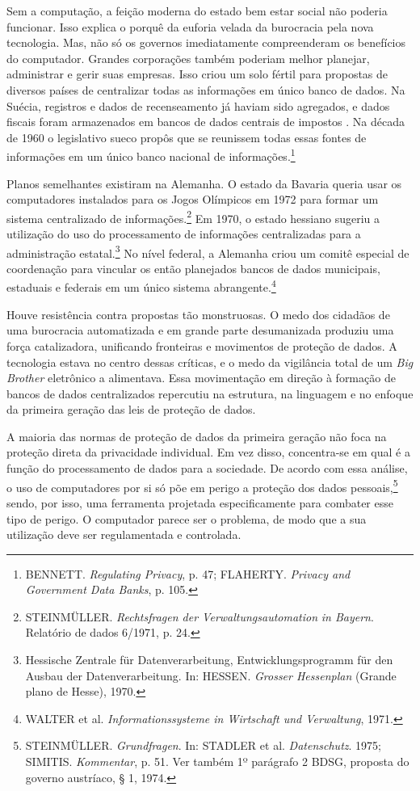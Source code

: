 Sem a computação, a feição moderna do estado bem estar social não
poderia funcionar. Isso explica o porquê da euforia velada da burocracia
pela nova tecnologia. Mas, não só os governos imediatamente
compreenderam os benefícios do computador. Grandes corporações também
poderiam melhor planejar, administrar e gerir suas empresas. Isso criou
um solo fértil para propostas de diversos países de centralizar todas as
informações em único banco de dados. Na Suécia, registros e dados de
recenseamento já haviam sido agregados, e dados fiscais foram
armazenados em bancos de dados centrais de impostos . Na década de 1960
o legislativo sueco propôs que se reunissem todas essas fontes de
informações em um único banco nacional de informações.\footnote{BENNETT.
  \emph{Regulating Privacy}, p. 47; FLAHERTY. \emph{Privacy and
  Government Data Banks}, p. 105.}

Planos semelhantes existiram na Alemanha. O estado da Bavaria queria
usar os computadores instalados para os Jogos Olímpicos em 1972 para
formar um sistema centralizado de informações.\footnote{STEINMÜLLER.
  \emph{Rechtsfragen der Verwaltungsautomation} \emph{in Bayern}.
  Relatório de dados 6/1971, p. 24.} Em 1970, o estado hessiano sugeriu
a utilização do uso do processamento de informações centralizadas para a
administração estatal.\footnote{Hessische Zentrale für
  Datenverarbeitung, Entwicklungsprogramm für den Ausbau der
  Datenverarbeitung. In: HESSEN. \emph{Grosser Hessenplan} (Grande plano
  de Hesse), 1970.} No nível federal, a Alemanha criou um comitê
especial de coordenação para vincular os então planejados bancos de
dados municipais, estaduais e federais em um único sistema
abrangente.\footnote{WALTER et al. \emph{Informationssysteme in
  Wirtschaft und Verwaltung}, 1971.}

Houve resistência contra propostas tão monstruosas. O medo dos cidadãos
de uma burocracia automatizada e em grande parte desumanizada produziu
uma força catalizadora, unificando fronteiras e movimentos de proteção
de dados. A tecnologia estava no centro dessas críticas, e o medo da
vigilância total de um \emph{Big Brother} eletrônico a alimentava. Essa
movimentação em direção à formação de bancos de dados centralizados
repercutiu na estrutura, na linguagem e no enfoque da primeira geração
das leis de proteção de dados.

A maioria das normas de proteção de dados da primeira geração não foca
na proteção direta da privacidade individual. Em vez disso, concentra-se
em qual é a função do processamento de dados para a sociedade. De acordo
com essa análise, o uso de computadores por si só põe em perigo a
proteção dos dados pessoais,\footnote{STEINMÜLLER. \emph{Grundfragen}.
  In: STADLER et al. \emph{Datenschutz}. 1975; SIMITIS.
  \emph{Kommentar}, p. 51. Ver também 1º parágrafo 2 BDSG, proposta do
  governo austríaco, § 1, 1974.} sendo, por isso, uma ferramenta
projetada especificamente para combater esse tipo de perigo. O
computador parece ser o problema, de modo que a sua utilização deve ser
regulamentada e controlada.

